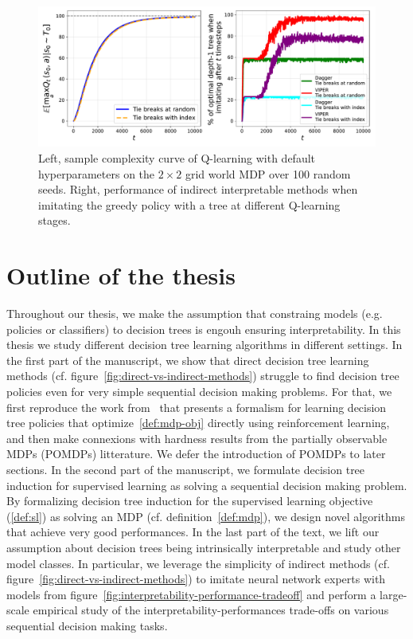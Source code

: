 \begin{figure}
    \centering
    \includegraphics[width=1\textwidth]{images/images_part1/base_mdp.pdf}
    \caption{Left, sample complexity curve of Q-learning with default hyperparameters on the $2\times 2$ grid world MDP over 100 random seeds. Right, performance of indirect interpretable methods when imitating the greedy policy with a tree at different Q-learning stages.}\label{fig:ql-il}
\end{figure}

\section{Outline of the thesis}
Throughout our thesis, we make the assumption that constraing models (e.g. policies or classifiers) to decision trees is engouh ensuring interpretability.
In this thesis we study different decision tree learning algorithms in different settings. 
In the first part of the manuscript, we show that direct decision tree learning methods (cf. figure~\ref{fig:direct-vs-indirect-methods}) struggle to find decision tree policies even for very simple sequential decision making problems.
For that, we first reproduce the work from~\cite{topin2021iterative} that presents a formalism for learning decision tree policies that optimize~\ref{def:mdp-obj} directly using reinforcement learning, and then make connexions with hardness results from the partially observable MDPs (POMDPs)\cite{POMDP,chap2} litterature.
We defer the introduction of POMDPs to later sections.
In the second part of the manuscript, we formulate decision tree induction for supervised learning as solving a sequential decision making problem.
By formalizing decision tree induction for the supervised learning objective (\ref{def:sl}) as solving an MDP (cf. definition~\ref{def:mdp}), we design novel algorithms that achieve very good performances.
In the last part of the text, we lift our assumption about decision trees being intrinsically interpretable and study other model classes.
In particular, we leverage the simplicity of indirect methods (cf. figure~\ref{fig:direct-vs-indirect-methods}) to imitate neural network experts with models from figure~\ref{fig:interpretability-performance-tradeoff} and perform a large-scale empirical study of the interpretability-performances trade-offs on various sequential decision making tasks.

